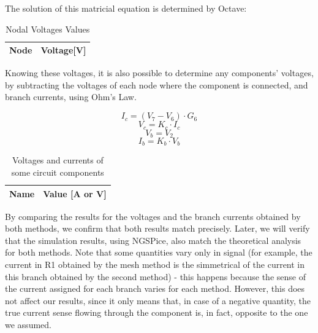 The solution of this matricial equation is determined by Octave:

\begin{table}[H]
  \centering
  \begin{tabular}{|l|r|}
    \hline    
    {\bf Node} & {\bf Voltage[V]} \\ \hline
    
  \end{tabular}
  \caption{Nodal Voltages Values}
  \label{tab:nodal}
\end{table}

Knowing these voltages, it is also possible to determine any components' voltages, by subtracting the voltages of each node where the component is connected, and branch currents, using Ohm’s Law.

\begin{equation}
  I_c=(V_7-V_6)\cdot G_6
\end{equation}
\begin{equation}
  V_c=K_c\cdot I_c
\end{equation}
\begin{equation}
  V_b=V_2
\end{equation}
\begin{equation}
  I_b=K_b\cdot V_b
 \end{equation}
 
 \begin{table}[H]
  \centering
  \begin{tabular}{|l|r|}
    \hline    
    {\bf Name} & {\bf Value [A or V]} \\ \hline
    
  \end{tabular}
  \caption{Voltages and currents of some circuit components}
  \label{tab:valn}
\end{table}

By comparing the results for the voltages and the branch currents obtained by both methods, we confirm that both results match precisely. Later, we will verify that the simulation results, using NGSPice, also match the theoretical analysis for both methods. Note that some quantities vary only in signal (for example, the current in R1 obtained by the mesh method is the simmetrical of the current in this branch obtained by the second method) - this happens because the sense of the current assigned for each branch varies for each method. However, this does not affect our results, since it only means that, in case of a negative quantity, the true current sense flowing through the component is, in fact, opposite to the one we assumed.
